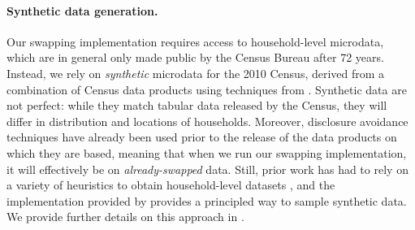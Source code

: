 \paragraph*{Synthetic data generation.}

Our swapping implementation requires access to household-level microdata, which are in general only made public by the Census Bureau after 72 years.
Instead, we rely on \textit{synthetic} microdata for the 2010 Census, derived from a combination of Census data products using techniques from \citet{syn-data}.
Synthetic data are not perfect: while they match tabular data released by the Census, they will differ in distribution and locations of households.
Moreover, disclosure avoidance techniques have already been used prior to the release of the data products on which they are based, meaning that when we run our swapping implementation, it will effectively be on \textit{already-swapped} data.
Still, prior work has had to rely on a variety of heuristics to obtain household-level datasets \citep{cohen2021census,christ2022differential}, and the implementation provided by \citet{syn-data} provides a principled way to sample synthetic data.
We provide further details on this approach in .
